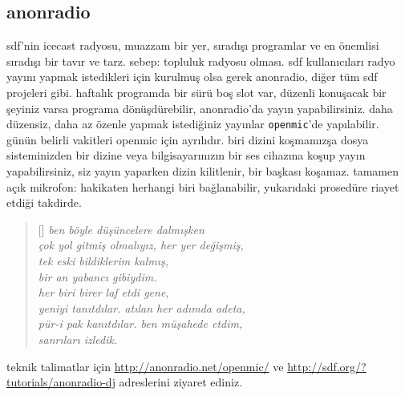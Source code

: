 \documentclass[a4paper, twocolumn]{memoir}
\begin{document}
\subsection{anonradio}
sdf'nin icecast radyosu, muazzam bir yer, sıradışı programlar ve en
önemlisi sıradışı bir tavır ve tarz. sebep: topluluk radyosu olması. sdf
kullanıcıları radyo yayını yapmak istedikleri için kurulmuş olsa gerek
anonradio, diğer tüm sdf projeleri gibi. haftalık programda bir sürü boş
slot var, düzenli konuşacak bir şeyiniz varsa programa dönüşdürebilir,
anonradio'da yayın yapabilirsiniz. daha düzensiz, daha az özenle yapmak
istediğiniz yayınlar \texttt{openmic}'de yapılabilir. günün belirli
vakitleri openmic için ayrılıdır. biri dizini koşmamızşa dosya
sisteminizden bir dizine veya bilgisayarınızın bir ses cihazına koşup
yayın yapabilirsiniz, siz yayın yaparken dizin kilitlenir, bir başkası
koşamaz. tamamen açık mikrofon: hakikaten herhangi biri bağlanabilir,
yukarıdaki prosedüre riayet etdiği takdirde.
\begin{verse}[\versewidth]
\itshape{}
ben böyle düşüncelere dalmışken\\
çok yol gitmiş olmalıyız, her yer değişmiş,\\
tek eski bildiklerim kalmış,\\
bir an yabancı gibiydim.\\
her biri birer laf etdi gene,\\
yeniyi tanıtdılar. atılan her adımda adeta,\\
pür-i pak kanıtdılar. ben müşahede etdim,\\
sanrıları izledik.\\
\end{verse}
teknik talimatlar için \url{http://anonradio.net/openmic/} ve
\url{http://sdf.org/?tutorials/anonradio-dj} adreslerini ziyaret ediniz.
\end{document}
